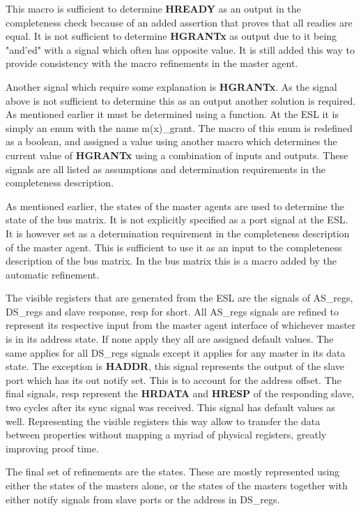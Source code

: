 
This macro is sufficient to determine \textbf{HREADY} as an output in the completeness check because of an added assertion that proves that all readies
are equal. It is not sufficient to determine \textbf{HGRANTx} as output due to it being "and'ed" with a signal which often has opposite value. It is still added this way to provide consistency with the macro refinements in the master agent. \par
Another signal which require some explanation is \textbf{HGRANTx}. As the signal above is not sufficient to determine this as an output another solution is required. As mentioned earlier it must be determined using a function. At the ESL it is simply an enum with the name m(x)\_grant. The macro of this enum
is redefined as a boolean, and assigned a value using another macro which determines the current value of \textbf{HGRANTx} using a combination of inputs
and outputs. These signals are all listed as assumptions and determination requirements in the completeness description. \par
As mentioned earlier, the states of the master agents are used to determine the state of the bus matrix. It is not explicitly specified as a port signal at the
ESL. It is however set as a determination requirement in the completeness description of the master agent. This is sufficient to use it as an input to the
completeness description of the bus matrix. In the bus matrix this is a macro added by the automatic refinement. \par
The visible registers that are generated from the ESL are the signals of AS\_regs, DS\_regs and slave response, resp for short. All AS\_regs signals are refined
to represent its respective input from the master agent interface of whichever master is in its address state. If none apply they all are assigned default values. The same applies for all DS\_regs signals except it applies for any master in its data state. The exception is \textbf{HADDR}, this signal represents the output of the slave port which has its out notify set. This is to account for the address offset. The final signals, resp represent the \textbf{HRDATA} and \textbf{HRESP} of the responding slave, two cycles after its sync signal was received. This signal has default values as well. Representing the visible registers this way allow to transfer the data between properties without mapping a myriad of physical registers, greatly improving proof time. \par
The final set of refinements are the states. These are mostly represented using either the states of the masters alone, or the states of the masters together with either notify signals from slave ports or the address in DS\_regs. 


